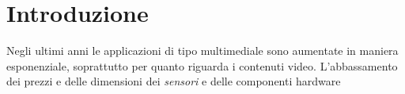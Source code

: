 \chapter{Introduzione}
\label{Introduzione}
\thispagestyle{empty}

\vspace{0.5cm}

\noindent Negli ultimi anni le applicazioni di tipo multimediale sono aumentate in maniera esponenziale, soprattutto per quanto riguarda i contenuti video. L'abbassamento dei prezzi e delle dimensioni dei \textit{sensori} e delle componenti hardware
